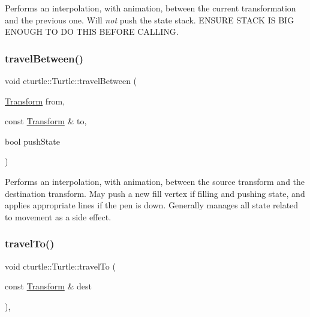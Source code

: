 Performs an interpolation, with animation, between the current transformation and the previous one. Will {\itshape not} push the state stack. E\+N\+S\+U\+RE S\+T\+A\+CK IS B\+IG E\+N\+O\+U\+GH TO DO T\+H\+IS B\+E\+F\+O\+RE C\+A\+L\+L\+I\+NG. \mbox{\label{classcturtle_1_1Turtle_a1fada959d0f1bd31b3854adea6d3d6de}} 
\subsubsection{\texorpdfstring{travel\+Between()}{travelBetween()}}
{\footnotesize\ttfamily void cturtle\+::\+Turtle\+::travel\+Between (\begin{DoxyParamCaption}\item[{\hyperlink{classcturtle_1_1Transform}{Transform}}]{from,  }\item[{const \hyperlink{classcturtle_1_1Transform}{Transform} \&}]{to,  }\item[{bool}]{push\+State }\end{DoxyParamCaption})\hspace{0.3cm}{\ttfamily [protected]}}

Performs an interpolation, with animation, between the source transform and the destination transform. May push a new fill vertex if filling and pushing state, and applies appropriate lines if the pen is down. Generally manages all state related to movement as a side effect. \mbox{\label{classcturtle_1_1Turtle_af838da6166c05227dac1a8b57ca27414}} 
\subsubsection{\texorpdfstring{travel\+To()}{travelTo()}}
{\footnotesize\ttfamily void cturtle\+::\+Turtle\+::travel\+To (\begin{DoxyParamCaption}\item[{const \hyperlink{classcturtle_1_1Transform}{Transform} \&}]{dest }\end{DoxyParamCaption})\hspace{0.3cm}{\ttfamily [inline]}, {\ttfamily [protected]}}

